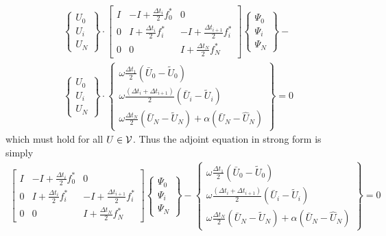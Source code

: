 \documentclass[10pt]{article}
\begin{document}
\begin{eqnarray}
\left\{\begin{array}{c} U_0 \\ U_i \\ U_N \end{array}\right\}
\cdot
\left[ \begin{array}{ccc} 
I & -I + \frac{\Delta t_i}{2} f^*_{0} & 0 \\
0 & I + \frac{\Delta t_i}{2} f^*_i & -I + \frac{\Delta t_{i+1}}{2} f^*_{i} \\
0 &  0 & I + \frac{\Delta t_N}{2} f^*_N
\end{array} \right] 
\left\{\begin{array}{c} \Psi_0 \\ \Psi_i \\ \Psi_N \end{array} \right\} - 
\nonumber \\
\left\{\begin{array}{c} U_0 \\ U_i \\ U_N \end{array}\right\}
\cdot
\left\{\begin{array}{c} 
\omega\frac{\Delta t_1}{2} (\bar U_0 - \tilde U_0)  \\ 
\omega\frac{(\Delta t_i+\Delta t_{i+1})}{2} (\bar U_i - \tilde U_i) \\ 
\omega\frac{\Delta t_N}{2} (\bar U_N - \tilde U_N) +
\alpha (\bar U_N - \hat U_N)
\end{array}\right\} = 0
\end{eqnarray}
which must hold for all $U\in{\cal V}$.  Thus the adjoint equation in strong
form is simply
\begin{eqnarray}
\left[ \begin{array}{ccc} 
I & -I + \frac{\Delta t_i}{2} f^*_{0} & 0 \\
0 & I + \frac{\Delta t_i}{2} f^*_i & -I + \frac{\Delta t_{i+1}}{2} f^*_{i} \\
0 &  0 & I + \frac{\Delta t_N}{2} f^*_N
\end{array} \right] 
\left\{\begin{array}{c} \Psi_0 \\ \Psi_i \\ \Psi_N \end{array} \right\} - 
\left\{\begin{array}{c} 
\omega\frac{\Delta t_1}{2} (\bar U_0 - \tilde U_0)  \\ 
\omega\frac{(\Delta t_i+\Delta t_{i+1})}{2} (\bar U_i - \tilde U_i) \\ 
\omega\frac{\Delta t_N}{2} (\bar U_N - \tilde U_N) +
\alpha (\bar U_N - \hat U_N)
\end{array}\right\} = 0
\end{eqnarray}
\end{document}
